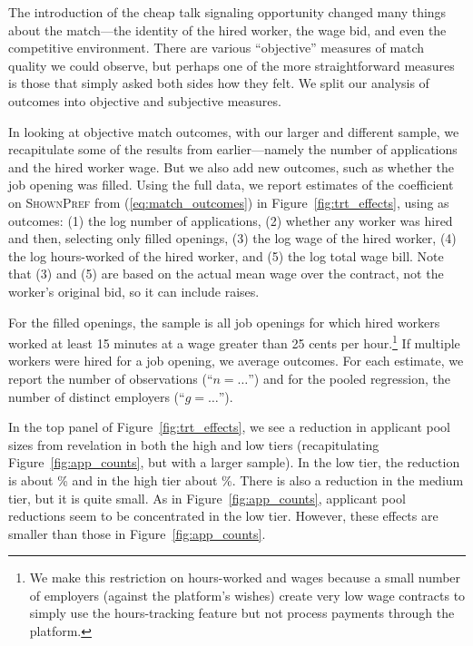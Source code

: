 \documentclass[12pt]{article}
\makeatletter
\renewcommand{\subsection}{%
  \@startsection{subsection}{2}{\z@}%
  {-3.25ex plus -1ex minus -.2ex}%
  {1.5ex plus .2ex}%
  {\normalfont\large\bfseries}%
}
\makeatother
\begin{document}
The introduction of the cheap talk signaling opportunity changed many things about the match---the identity of the hired worker, the wage bid, and even the competitive environment. 
There are various ``objective'' measures of match quality we could observe, but perhaps one of the more straightforward measures is those that simply asked both sides how they felt. 
We split our analysis of outcomes into objective and subjective measures.

In looking at objective match outcomes, with our larger and different sample, we recapitulate some of the results from earlier---namely the number of applications and the hired worker wage. 
But we also add new outcomes, such as whether the job opening was filled. 
Using the full data, we report estimates of the coefficient on {\textsc{ShownPref}} from (\ref{eq:match_outcomes}) in Figure~\ref{fig:trt_effects}, using as outcomes:
(1) the log number of applications,
(2) whether any worker was hired and 
then, selecting only filled openings, 
(3) the log wage of the hired worker,
(4) the log hours-worked of the hired worker, 
and (5) the log total wage bill.
Note that (3) and (5) are based on the actual mean wage over the contract, not the worker's original bid, so it can include raises. 

For the filled openings, the sample is all job openings for which hired workers worked at least 15 minutes at a wage greater than 25 cents per hour.\footnote{
  We make this restriction on hours-worked and wages because a small number of employers (against the platform's wishes) create very low wage contracts to simply use the hours-tracking feature but not process payments through the platform.
}
If multiple workers were hired for a job opening, we average outcomes. 
For each estimate, we report the number of observations (``$n=\ldots$'') and for the pooled regression, the number of distinct employers (``$g=\ldots$'').

In the top panel of Figure~\ref{fig:trt_effects}, we see a reduction in applicant pool sizes from revelation in both the high and low tiers (recapitulating Figure~\ref{fig:app_counts}, but with a larger sample).
In the low tier, the reduction is about \NumAppsEffectLow{}\% and in the high tier about \NumAppsEffectHigh{}\%.
There is also a reduction in the medium tier, but it is quite small. 
As in Figure~\ref{fig:app_counts}, applicant pool reductions seem to be concentrated in the low tier.
However, these effects are smaller than those in Figure~\ref{fig:app_counts}. 
\end{document}
